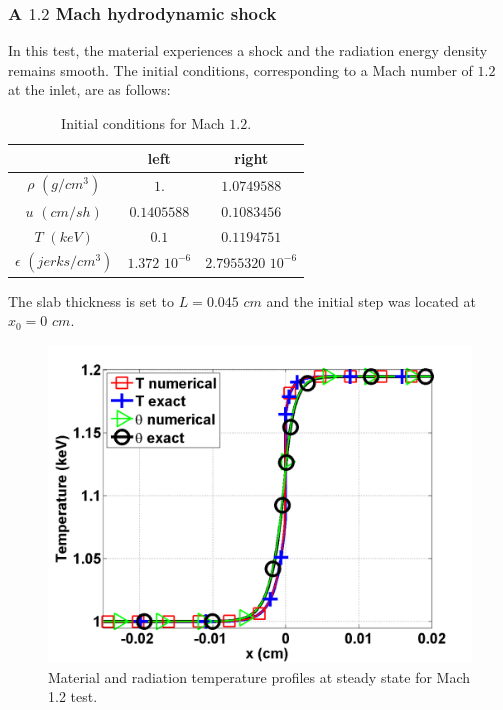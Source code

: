 \documentclass[review]{elsarticle}
\begin{document}
\subsubsection{A $1.2$ Mach hydrodynamic shock}

In this test, the material experiences a shock and the radiation energy density remains smooth. The initial conditions, corresponding to a Mach number of $1.2$ at the inlet, are as follows: 
\begin{table}[H]
\caption{\label{tbl:table4} Initial conditions for Mach $1.2$.}
\begin{center}
\begin{tabular}{|c|c|c|}
\hline 
 & left  & right \\ \hline
$\rho$ $(g/cm^3)$ &$1.$ & $1.0749588$ \\ \hline
$u$ $(cm/sh)$& $0.1405588$ & $0.1083456$ \\ \hline
$T$ $(keV)$& $0.1$ & $0.1194751$\\ \hline
$\epsilon$ $(jerks/cm^3)$ & $1.372$ $10^{-6}$ & $2.7955320$ $10^{-6}$\\
\hline
\end{tabular}  
\end{center}  
\end{table}
The slab thickness is set to $L=0.045$ $cm$ and the initial step was located at $x_0 = 0$ $cm$. 
\begin{figure}[H]
       \centering
       \includegraphics[width=\textwidth]{Mach_1p2_nel_1000_temperature.png}
       \caption{Material and radiation temperature profiles at steady state for Mach 1.2 test.}\label{fig:Mach12_temp}
\end{figure}
\end{document}
